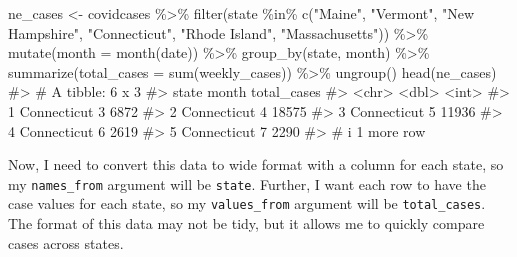 \documentclass[
  letterpaper,
]{krantz}
\makeatletter
\newenvironment{Shaded}{\begin{snugshade}}{\end{snugshade}}
\newcommand{\AttributeTok}[1]{\textcolor[rgb]{0.40,0.45,0.13}{#1}}
\newcommand{\CommentTok}[1]{\textcolor[rgb]{0.37,0.37,0.37}{#1}}
\newcommand{\FunctionTok}[1]{\textcolor[rgb]{0.28,0.35,0.67}{#1}}
\newcommand{\NormalTok}[1]{\textcolor[rgb]{0.00,0.23,0.31}{#1}}
\newcommand{\OtherTok}[1]{\textcolor[rgb]{0.00,0.23,0.31}{#1}}
\newcommand{\SpecialCharTok}[1]{\textcolor[rgb]{0.37,0.37,0.37}{#1}}
\newcommand{\StringTok}[1]{\textcolor[rgb]{0.13,0.47,0.30}{#1}}
\newenvironment{kframe}{%
\medskip{}
\setlength{\fboxsep}{.8em}
 \def\at@end@of@kframe{}%
 \ifinner\ifhmode%
  \def\at@end@of@kframe{\end{minipage}}%
  \begin{minipage}{\columnwidth}%
 \fi\fi%
 \def\FrameCommand##1{\hskip\@totalleftmargin \hskip-\fboxsep
 \colorbox{shadecolor}{##1}\hskip-\fboxsep
     \hskip-\linewidth \hskip-\@totalleftmargin \hskip\columnwidth}%
 \MakeFramed {\advance\hsize-\width
   \@totalleftmargin\z@ \linewidth\hsize
   \@setminipage}}%
 {\par\unskip\endMakeFramed%
 \at@end@of@kframe}
\renewenvironment{Shaded}{\begin{kframe}}{\end{kframe}}
\makeatother
\begin{document}
\begin{Shaded}
\begin{Highlighting}[]
\NormalTok{ne\_cases }\OtherTok{\textless{}{-}}\NormalTok{ covidcases }\SpecialCharTok{\%\textgreater{}\%} 
  \FunctionTok{filter}\NormalTok{(state }\SpecialCharTok{\%in\%} \FunctionTok{c}\NormalTok{(}\StringTok{"Maine"}\NormalTok{, }\StringTok{"Vermont"}\NormalTok{, }\StringTok{"New Hampshire"}\NormalTok{, }
                      \StringTok{"Connecticut"}\NormalTok{, }\StringTok{"Rhode Island"}\NormalTok{, }
                      \StringTok{"Massachusetts"}\NormalTok{)) }\SpecialCharTok{\%\textgreater{}\%}
  \FunctionTok{mutate}\NormalTok{(}\AttributeTok{month =} \FunctionTok{month}\NormalTok{(date)) }\SpecialCharTok{\%\textgreater{}\%}
  \FunctionTok{group\_by}\NormalTok{(state, month) }\SpecialCharTok{\%\textgreater{}\%}
  \FunctionTok{summarize}\NormalTok{(}\AttributeTok{total\_cases =} \FunctionTok{sum}\NormalTok{(weekly\_cases)) }\SpecialCharTok{\%\textgreater{}\%}
  \FunctionTok{ungroup}\NormalTok{()}
\FunctionTok{head}\NormalTok{(ne\_cases)}
\CommentTok{\#\textgreater{} \# A tibble: 6 x 3}
\CommentTok{\#\textgreater{}   state       month total\_cases}
\CommentTok{\#\textgreater{}   \textless{}chr\textgreater{}       \textless{}dbl\textgreater{}       \textless{}int\textgreater{}}
\CommentTok{\#\textgreater{} 1 Connecticut     3        6872}
\CommentTok{\#\textgreater{} 2 Connecticut     4       18575}
\CommentTok{\#\textgreater{} 3 Connecticut     5       11936}
\CommentTok{\#\textgreater{} 4 Connecticut     6        2619}
\CommentTok{\#\textgreater{} 5 Connecticut     7        2290}
\CommentTok{\#\textgreater{} \# i 1 more row}
\end{Highlighting}
\end{Shaded}

Now, I need to convert this data to wide format with a column for each
state, so my \texttt{names\_from} argument will be \texttt{state}.
Further, I want each row to have the case values for each state, so my
\texttt{values\_from} argument will be \texttt{total\_cases}. The format
of this data may not be tidy, but it allows me to quickly compare cases
across states.
\end{document}
